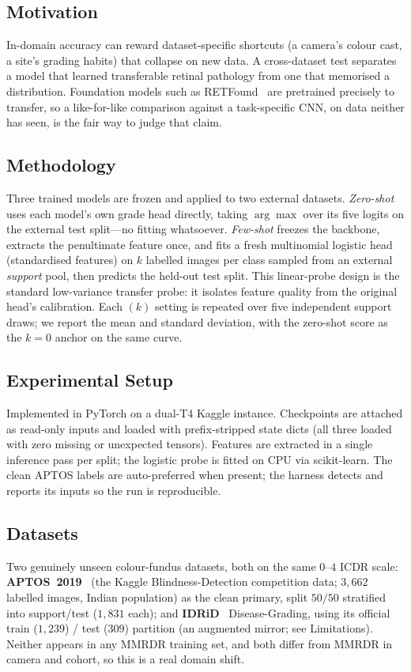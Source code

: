 \documentclass[journal,twoside,web]{ieeecolor}
\begin{document}
\subsection{Motivation}
In-domain accuracy can reward dataset-specific shortcuts (a camera's colour cast, a
site's grading habits) that collapse on new data. A cross-dataset test separates a
model that learned transferable retinal pathology from one that memorised a
distribution. Foundation models such as RETFound~\cite{retfound} are pretrained
precisely to transfer, so a like-for-like comparison against a task-specific CNN, on
data neither has seen, is the fair way to judge that claim.

\subsection{Methodology}
Three trained models are frozen and applied to two external datasets. \emph{Zero-shot}
uses each model's own grade head directly, taking $\arg\max$ over its five logits on
the external test split---no fitting whatsoever. \emph{Few-shot} freezes the backbone,
extracts the penultimate feature once, and fits a fresh multinomial logistic head
(standardised features) on $k$ labelled images per class sampled from an external
\emph{support} pool, then predicts the held-out test split. This linear-probe design
is the standard low-variance transfer probe: it isolates feature quality from the
original head's calibration. Each $(k)$ setting is repeated over five independent
support draws; we report the mean and standard deviation, with the zero-shot score as
the $k{=}0$ anchor on the same curve.

\subsection{Experimental Setup}
Implemented in PyTorch on a dual-T4 Kaggle instance. Checkpoints are attached as
read-only inputs and loaded with prefix-stripped state dicts (all three loaded with
zero missing or unexpected tensors). Features are extracted in a single inference
pass per split; the logistic probe is fitted on CPU via scikit-learn. The clean APTOS
labels are auto-preferred when present; the harness detects and reports its inputs so
the run is reproducible.

\subsection{Datasets}
Two genuinely unseen colour-fundus datasets, both on the same $0$--$4$ ICDR scale:
\textbf{APTOS~2019}~\cite{aptos} (the Kaggle Blindness-Detection competition data;
$3{,}662$ labelled images, Indian population) as the clean primary, split
$50/50$ stratified into support/test ($1{,}831$ each); and \textbf{IDRiD}~\cite{idrid}
Disease-Grading, using its official train ($1{,}239$) / test ($309$) partition (an
augmented mirror; see Limitations). Neither appears in any MMRDR training set, and
both differ from MMRDR in camera and cohort, so this is a real domain shift.
\end{document}
